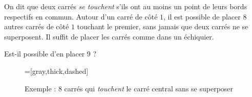 On dit que deux carrés \emph{se touchent} s'ils ont au moins un point de leurs bords respectifs en commun. Autour d'un carré de côté $1$, il est possible de placer $8$ autres carrés de côté $1$ touchant le premier, sans jamais que deux carrés ne se superposent. Il suffit de placer les carrés comme dans un échiquier.

Est-il possible d'en placer $9$ ?

\begin{figure}[h!]
\centering
{}=[gray,thick,dashed]
\caption{Exemple : $8$ carrés qui \emph{touchent} le carré central sans se superposer}
\end{figure}